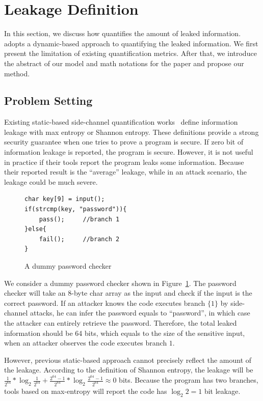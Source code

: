 \section{\tool{} Leakage Definition}
\label{sec:trace-qif}
In this section, we discuss how \tool{} quantifies the amount of leaked
information. \tool{} adopts a dynamic-based approach to quantifying the leaked
information. We first present the limitation of existing quantification metrics.
After that, we introduce the abstract of our model and math notations for the
paper and propose our method.

\subsection{Problem Setting}
Existing static-based side-channel quantification
works~\cite{182946,Wichelmann:2018:MFF:3274694.3274741 } define information
leakage with max entropy or Shannon entropy. These definitions provide a strong
security guarantee when one tries to prove a program is secure.  If zero bit of
information leakage is reported, the program is secure. However, it is not
useful in practice if their tools report the program leaks some information.
Because their reported result is the ``average'' leakage, while in an attack
scenario, the leakage could be much severe.


\begin{figure}[h!]
    \centering
    \begin{lstlisting}[xleftmargin=.03\textwidth,xrightmargin=.01\textwidth]
char key[9] = input();
if(strcmp(key, "password")){
    pass();     //branch 1
}else{
    fail();     //branch 2
}
\end{lstlisting}
    \caption{A dummy password checker}
    \label{fig:password-checker}
\end{figure}

We consider a dummy password checker shown in Figure~\ref{fig:password-checker}.
The password checker will take an 8-byte char array as the input and check if
the input is the correct password. If an attacker knows the code executes branch
$\{{1\}}$ by side-channel attacks, he can infer the password equals to
``password'', in which case the attacker can entirely retrieve the password.
Therefore, the total leaked information should be 64 bits, which equals to the
size of the sensitive input, when an attacker observes the code executes branch
$1$.

However, previous static-based approach cannot precisely reflect the amount of
the leakage. According to the definition of Shannon entropy, the leakage will be
$\frac{1}{2^{64}}*\log_{2}\frac{1}{2^{64}} + \frac{2^{64}-1}{2^{64}}
*\log_{2}\frac{2^{64}-1}{2^{64}} \approx 0$ bits. Because the program has two
branches, tools based on max-entropy will report the code has $\log_2{2} = 1$
bit leakage.

